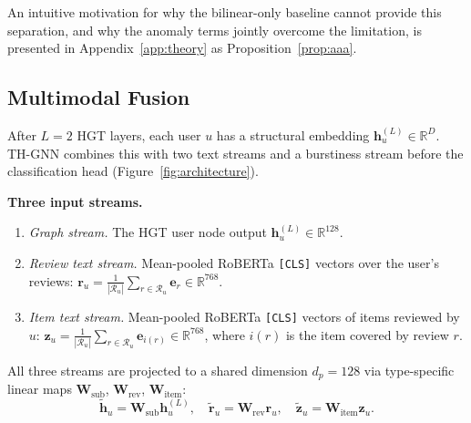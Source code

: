 An intuitive motivation for why the bilinear-only baseline cannot provide this
separation, and why the anomaly terms jointly overcome the limitation, is
presented in Appendix~\ref{app:theory} as Proposition~\ref{prop:aaa}.

\subsection{Multimodal Fusion}
\label{sec:fusion}

After $L = 2$ HGT layers, each user $u$ has a structural embedding
$\mathbf{h}_u^{(L)} \in \mathbb{R}^D$.
TH-GNN combines this with two text streams and a burstiness stream before
the classification head (Figure~\ref{fig:architecture}).

\textbf{Three input streams.}
\begin{enumerate}[leftmargin=1.8em,itemsep=1pt]
  \item \emph{Graph stream.}
        The HGT user node output
        $\mathbf{h}_u^{(L)} \in \mathbb{R}^{128}$.
  \item \emph{Review text stream.}
        Mean-pooled RoBERTa \texttt{[CLS]} vectors over the user's reviews:
        $\mathbf{r}_u
          = \tfrac{1}{|\mathcal{R}_u|}
            \sum_{r \in \mathcal{R}_u} \mathbf{e}_r
          \in \mathbb{R}^{768}$.
  \item \emph{Item text stream.}
        Mean-pooled RoBERTa \texttt{[CLS]} vectors of items reviewed by $u$:
        $\mathbf{z}_u
          = \tfrac{1}{|\mathcal{R}_u|}
            \sum_{r \in \mathcal{R}_u} \mathbf{e}_{i(r)}
          \in \mathbb{R}^{768}$,
        where $i(r)$ is the item covered by review $r$.
\end{enumerate}
All three streams are projected to a shared dimension $d_p = 128$ via
type-specific linear maps $\mathbf{W}_{\mathrm{sub}}$, $\mathbf{W}_{\mathrm{rev}}$,
$\mathbf{W}_{\mathrm{item}}$:
\[
  \tilde{\mathbf{h}}_u = \mathbf{W}_{\mathrm{sub}}\mathbf{h}_u^{(L)}, \quad
  \tilde{\mathbf{r}}_u = \mathbf{W}_{\mathrm{rev}}\mathbf{r}_u, \quad
  \tilde{\mathbf{z}}_u = \mathbf{W}_{\mathrm{item}}\mathbf{z}_u.
\]

